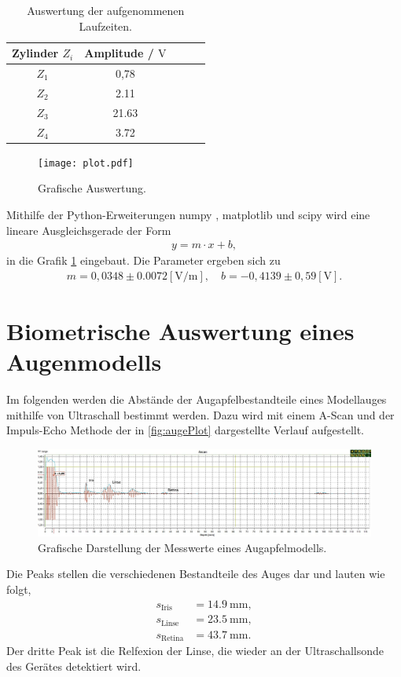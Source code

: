 \begin{table}
  \centering
  \caption{Auswertung der aufgenommenen Laufzeiten.}
  \label{tab:amplis}
  \begin{tabular}{c c c c c}
    \toprule
    Zylinder $Z_i$ &  Amplitude / $\si{\volt}$ \\
    \midrule
    $Z_1$ & 0,78 \\
    $Z_2$ & 2.11 \\
    $Z_3$ & 21.63 \\
    $Z_4$ & 3.72 \\
    \bottomrule
  \end{tabular}
\end{table}

\begin{figure}[H]
  \centering
  \texttt{[image: plot.pdf]}
  \caption{Grafische Auswertung.}
  \label{fig:plot}
\end{figure}

Mithilfe der Python-Erweiterungen numpy \cite{numpy}, matplotlib \cite{matplotlib} und scipy \cite{scipy} wird eine lineare Ausgleichsgerade
der Form
\begin{align*}
  y = m\cdot x + b,
\end{align*}
in die Grafik \ref{fig:plot} eingebaut. Die Parameter ergeben sich zu
\begin{align*}
  m = 0,0348 \pm 0.0072 \left[\si{\volt\per\meter}\right], \quad b = -0,4139 \pm 0,59 \left[\si{\volt}\right].
\end{align*}

\section{Biometrische Auswertung eines Augenmodells}
\label{sec:auge}

Im folgenden werden die Abstände der Augapfelbestandteile eines Modellauges mithilfe von Ultraschall bestimmt werden. 
Dazu wird mit einem A-Scan und der Impuls-Echo Methode der in \autoref{fig:augePlot} dargestellte Verlauf aufgestellt.

\begin{figure}[H]
  \centering
  \includegraphics[width = \textwidth]{data/Auge.png}
  \caption{Grafische Darstellung der Messwerte eines Augapfelmodells.}
  \label{fig:augePlot}
\end{figure}

Die Peaks stellen die verschiedenen Bestandteile des Auges dar und lauten wie folgt,
\begin{align*}
  s_{\text{Iris}} &= \SI{14,9}{\mm}, \\
  s_{\text{Linse}} &= \SI{23,5}{\mm}, \\
  s_{\text{Retina}} &= \SI{43,7}{\mm}.
\end{align*}
Der dritte Peak ist die Relfexion der Linse, die wieder an der Ultraschallsonde des Gerätes detektiert wird.